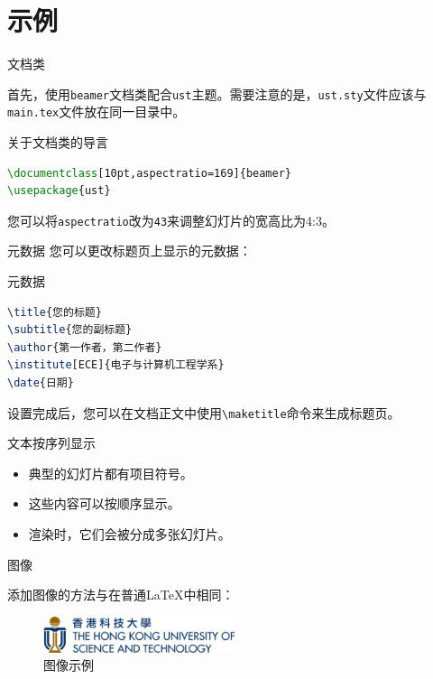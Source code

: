\section{示例}

\begin{frame}[fragile]{文档类}

	首先，使用\texttt{beamer}文档类配合\texttt{ust}主题。需要注意的是，\texttt{ust.sty}文件应该与\texttt{main.tex}文件放在同一目录中。
	
\begin{block}{关于文档类的导言}
\begin{lstlisting}[language=TeX]
\documentclass[10pt,aspectratio=169]{beamer}
\usepackage{ust}
\end{lstlisting}
\end{block}
	
	您可以将\texttt{aspectratio}改为\texttt{43}来调整幻灯片的宽高比为4:3。
\end{frame}

\begin{frame}[fragile]{元数据}
	您可以更改标题页上显示的元数据：

\begin{block}{元数据}
\begin{lstlisting}[language=TeX]
\title{您的标题}
\subtitle{您的副标题}
\author{第一作者，第二作者}
\institute[ECE]{电子与计算机工程学系}
\date{日期}
\end{lstlisting}
\end{block}

	设置完成后，您可以在文档正文中使用\verb|\maketitle|命令来生成标题页。
\end{frame}

\begin{frame}[fragile]{文本}{按序列显示}

	\begin{itemize}[<+->]
		\item 典型的幻灯片都有项目符号。
		\item 这些内容可以按顺序显示。
		\item 渲染时，它们会被分成多张幻灯片。
	\end{itemize}

\end{frame}

\begin{frame}{图像}

	添加图像的方法与在普通\LaTeX 中相同：
	
	\begin{figure}[hbt]
		\includegraphics[width=0.5\textwidth]{assets/template/logo-name.pdf}
 		\caption{图像示例}
	\end{figure}
	
\end{frame}

